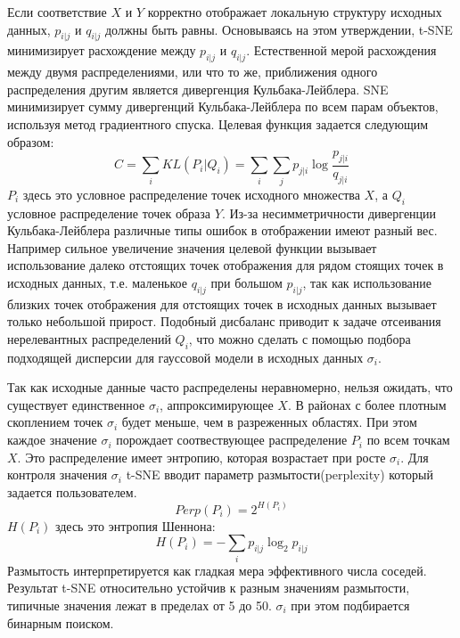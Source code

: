 Если соответствие $X$ и $Y$ корректно отображает локальную структуру исходных данных, $p_{i|j}$ и $q_{i|j}$ должны быть равны. Основываясь на этом утверждении, t-SNE минимизирует расхождение между $p_{i|j}$ и $q_{i|j}$. Естественной мерой расхождения между двумя распределениями, или что то же, приближения одного распределения другим является дивергенция Кульбака-Лейблера. SNE минимизирует сумму дивергенций Кульбака-Лейблера по всем парам объектов, используя метод градиентного спуска. Целевая функция задается следующим образом: 
\begin{equation}
	C = \sum_i KL(P_i | Q_i) = \sum_i \sum_j p_{j|i} \log{\frac{p_{j|i}}{q_{j|i}}}
\end{equation}
$P_i$ здесь это условное распределение точек исходного множества $X$, а $Q_i$ условное распределение точек образа $Y$. Из-за несимметричности дивергенции Кульбака-Лейблера различные типы ошибок в отображении имеют разный вес. Например сильное увеличение значения целевой функции вызывает использование далеко отстоящих точек отображения для рядом стоящих точек в исходных данных, т.е. маленькое $q_{i|j}$ при большом $p_{i|j}$, так как использование близких точек отображения для отстоящих точек в исходных данных вызывает только небольшой прирост. Подобный дисбаланс приводит к задаче отсеивания нерелевантных распределений $Q_i$, что можно сделать с помощью подбора подходящей дисперсии для гауссовой модели в исходных данных $\sigma_i$.

Так как исходные данные часто распределены неравномерно, нельзя ожидать, что существует единственное $\sigma_i$, аппроксимирующее $X$. В районах с более плотным скоплением точек $\sigma_i$ будет меньше, чем в разреженных областях. При этом каждое значение $\sigma_i$ порождает соотвествующее распределение $P_i$ по всем точкам $X$. Это распределение имеет энтропию, которая возрастает при росте $\sigma_i$. Для контроля значения $\sigma_i$ t-SNE вводит параметр размытости(perplexity) который задается пользователем. 
\begin{equation}
	Perp(P_i) = 2^{H(P_i)}
\end{equation}
$H(P_i)$ здесь это энтропия Шеннона:
\begin{equation}
	H(P_i) = - \sum_i p_{i|j} \log_2{p_{i|j}}
\end{equation}
Размытость интерпретируется как гладкая мера эффективного числа соседей. Результат t-SNE относительно устойчив к разным значениям размытости, типичные значения лежат в пределах от 5 до 50. $\sigma_i$ при этом подбирается бинарным поиском.

